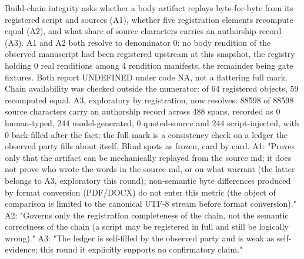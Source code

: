 \documentclass[
  english,
]{article}
\begin{document}
Build-chain integrity asks whether a body artifact replays byte-for-byte from its registered script and sources (A1), whether five registration elements recompute equal (A2), and what share of source characters carries an authorship record (A3). A1 and A2 both resolve to denominator 0: no body rendition of the observed manuscript had been registered upstream at this snapshot, the registry holding 0 real renditions among 4 rendition manifests, the remainder being gate fixtures. Both report UNDEFINED under code NA, not a flattering full mark. Chain availability was checked outside the numerator: of 64 registered objects, 59 recomputed equal. A3, exploratory by registration, now resolves: 88598 of 88598 source characters carry an authorship record across 488 spans, recorded as 0 human-typed, 244 model-generated, 0 quoted-source and 244 script-injected, with 0 back-filled after the fact; the full mark is a consistency check on a ledger the observed party fills about itself. Blind spots as frozen, card by card. A1: "Proves only that the artifact can be mechanically replayed from the source md; it does not prove who wrote the words in the source md, or on what warrant (the latter belongs to A3, exploratory this round); non-semantic byte differences produced by format conversion (PDF/DOCX) do not enter this metric (the object of comparison is limited to the canonical UTF-8 stream before format conversion)." A2: "Governs only the registration completeness of the chain, not the semantic correctness of the chain (a script may be registered in full and still be logically wrong)." A3: "The ledger is self-filled by the observed party and is weak as self-evidence; this round it explicitly supports no confirmatory claim."
\end{document}
